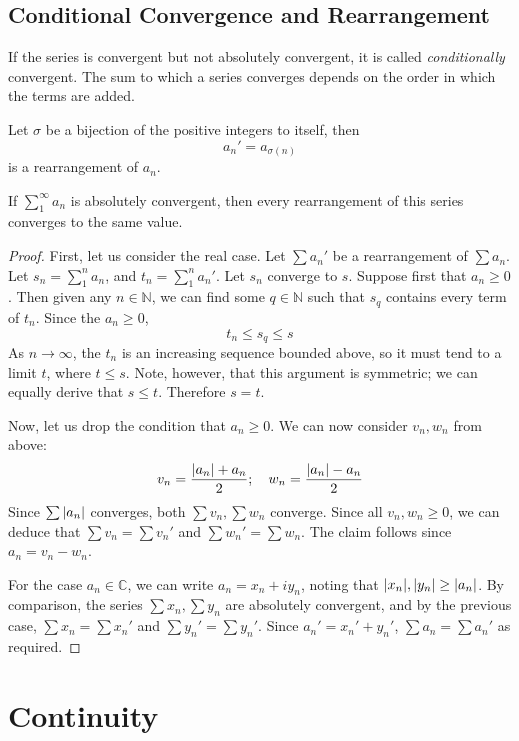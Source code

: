 \documentclass{article}
\begin{document}
\subsection{Conditional Convergence and Rearrangement}
If the series is convergent but not absolutely convergent, it is called \textit{conditionally} convergent. The sum to which a series converges depends on the order in which the terms are added.
\begin{definition}
	Let $\sigma$ be a bijection of the positive integers to itself, then
	\[ a_n' = a_{\sigma(n)} \]
	is a rearrangement of $a_n$.
\end{definition}
\begin{theorem}
	If $\sum_1^\infty a_n$ is absolutely convergent, then every rearrangement of this series converges to the same value.
\end{theorem}
\begin{proof}
	First, let us consider the real case. Let $\sum a_n'$ be a rearrangement of $\sum a_n$. Let $s_n = \sum_1^n a_n$, and $t_n = \sum_1^n a_n'$. Let $s_n$ converge to $s$. Suppose first that $a_n \geq 0$. Then given any $n \in \mathbb N$, we can find some $q \in \mathbb N$ such that $s_q$ contains every term of $t_n$. Since the $a_n \geq 0$,
	\[ t_n \leq s_q \leq s \]
	As $n \to \infty$, the $t_n$ is an increasing sequence bounded above, so it must tend to a limit $t$, where $t \leq s$. Note, however, that this argument is symmetric; we can equally derive that $s \leq t$. Therefore $s = t$.

	Now, let us drop the condition that $a_n \geq 0$. We can now consider $v_n, w_n$ from above:
	\[ v_n = \frac{\abs{a_n} + a_n}{2};\quad w_n = \frac{\abs{a_n} - a_n}{2} \]
	Since $\sum\abs{a_n}$ converges, both $\sum v_n, \sum w_n$ converge. Since all $v_n, w_n \geq 0$, we can deduce that $\sum v_n = \sum v_n'$ and $\sum w_n' = \sum w_n$. The claim follows since $a_n = v_n - w_n$.

	For the case $a_n \in \mathbb C$, we can write $a_n = x_n + iy_n$, noting that $\abs{x_n}, \abs{y_n} \geq \abs{a_n}$. By comparison, the series $\sum x_n, \sum y_n$ are absolutely convergent, and by the previous case, $\sum x_n = \sum x_n'$ and $\sum y_n' = \sum y_n'$. Since $a_n' = x_n' + y_n'$, $\sum a_n = \sum a_n'$ as required.
\end{proof}

\section{Continuity}
\end{document}
